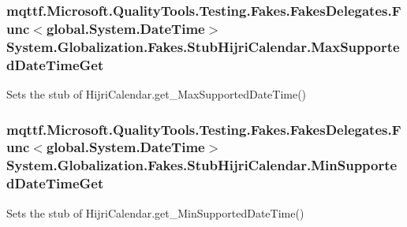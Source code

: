 \hypertarget{class_system_1_1_globalization_1_1_fakes_1_1_stub_hijri_calendar_a309b7c0ffa1c82dcf8937467ea0ebdf4}{
\subsubsection[{Max\-Supported\-Date\-Time\-Get}]{\setlength{\rightskip}{0pt plus 5cm}mqttf.\-Microsoft.\-Quality\-Tools.\-Testing.\-Fakes.\-Fakes\-Delegates.\-Func$<$global.\-System.\-Date\-Time$>$ System.\-Globalization.\-Fakes.\-Stub\-Hijri\-Calendar.\-Max\-Supported\-Date\-Time\-Get}}\label{class_system_1_1_globalization_1_1_fakes_1_1_stub_hijri_calendar_a309b7c0ffa1c82dcf8937467ea0ebdf4}


Sets the stub of Hijri\-Calendar.\-get\-\_\-\-Max\-Supported\-Date\-Time()

\hypertarget{class_system_1_1_globalization_1_1_fakes_1_1_stub_hijri_calendar_a0f62a415fc3d09d67c8dc80476f15964}{
\subsubsection[{Min\-Supported\-Date\-Time\-Get}]{\setlength{\rightskip}{0pt plus 5cm}mqttf.\-Microsoft.\-Quality\-Tools.\-Testing.\-Fakes.\-Fakes\-Delegates.\-Func$<$global.\-System.\-Date\-Time$>$ System.\-Globalization.\-Fakes.\-Stub\-Hijri\-Calendar.\-Min\-Supported\-Date\-Time\-Get}}\label{class_system_1_1_globalization_1_1_fakes_1_1_stub_hijri_calendar_a0f62a415fc3d09d67c8dc80476f15964}


Sets the stub of Hijri\-Calendar.\-get\-\_\-\-Min\-Supported\-Date\-Time()


